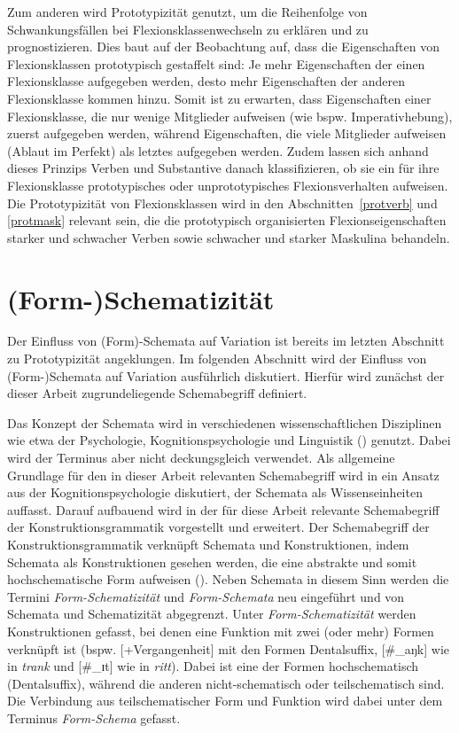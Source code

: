  
\begin{sloppypar}
Zum anderen wird Prototypizität genutzt, um die Reihenfolge von Schwankungsfällen bei Flexionsklassenwechseln zu erklären und zu prognostizieren. Dies baut auf der Beobachtung auf, dass die Eigenschaften von Flexionsklassen prototypisch gestaffelt sind: Je mehr Eigenschaften der einen Flexionsklasse aufgegeben werden, desto mehr Eigenschaften der anderen Flexionsklasse kommen hinzu. Somit ist zu erwarten, dass Eigenschaften einer Flexionsklasse, die nur wenige Mitglieder aufweisen (wie bspw. Imperativhebung), zuerst aufgegeben werden, während Eigenschaften, die viele Mitglieder aufweisen (Ablaut im Perfekt) als letztes aufgegeben werden. Zudem lassen sich anhand dieses Prinzips Verben und Substantive danach klassifizieren, ob sie ein für ihre Flexionsklasse prototypisches oder unprototypisches Flexionsverhalten aufweisen. Die Prototypizität von Flexionsklassen wird in den Abschnitten~\ref{protverb} und \ref{protmask} relevant sein, die die prototypisch organisierten Flexionseigenschaften starker und schwacher Verben sowie schwacher und starker Maskulina behandeln. 
\end{sloppypar}

\section{(Form-)Schematizität}\label{steuerungschema}\largerpage[-1]

Der Einfluss von (Form)-Schemata auf Variation ist bereits im letzten Abschnitt zu Prototypizität angeklungen. Im folgenden Abschnitt wird der Einfluss von (Form-)Schemata auf Variation ausführlich diskutiert. Hierfür wird zunächst der dieser Arbeit zugrundeliegende Schemabegriff definiert. 


Das Konzept der Schemata wird in verschiedenen wissenschaftlichen Disziplinen wie etwa der Psychologie, Kognitionspsychologie und Linguistik (\cite[447--450]{Bucker.2015}) genutzt. Dabei wird der Terminus aber nicht deckungsgleich verwendet. Als allgemeine Grundlage für den in dieser Arbeit relevanten Schemabegriff wird in  ein Ansatz aus der Kognitionspsychologie diskutiert, der Schemata als Wissenseinheiten auffasst. Darauf aufbauend wird in  der für diese Arbeit relevante Schemabegriff der Konstruktionsgrammatik vorgestellt und erweitert. Der Schemabegriff der Konstruktionsgrammatik verknüpft Schemata und Konstruktionen, indem Schemata als Konstruktionen gesehen werden, die eine abstrakte und somit hochschematische Form aufweisen (\cite{Goldberg.2006}). Neben Schemata in diesem Sinn werden die Termini \textit{Form-Schematizität} und \textit{Form-Schemata} neu eingeführt und von Schemata und Schematizität abgegrenzt. Unter \textit{Form-Schematizität} werden Konstruktionen gefasst, bei denen eine Funktion mit zwei (oder mehr) Formen verknüpft ist (bspw. [+Vergangenheit] mit den Formen Dentalsuffix, [\#\_aŋk] wie in \textit{trank} und [\#\_ɪt] wie in \textit{ritt}). Dabei ist eine der Formen hochschematisch (Dentalsuffix), während die anderen nicht-schematisch oder teilschematisch sind. Die Verbindung aus teilschematischer Form und Funktion wird dabei unter dem Terminus \textit{Form-Schema} gefasst. 


